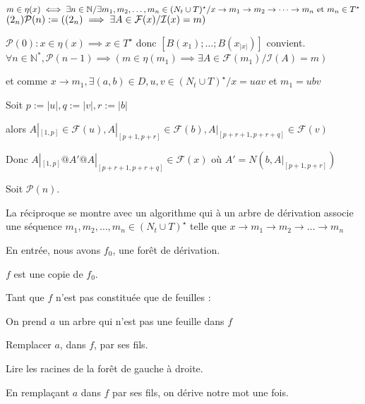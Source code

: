\documentclass[a4paper,12pt]{article}
\newcommand{\norm}[1]{\lvert #1 \rvert}
\newlength{\mydepth}
\newlength{\myheight}
\newenvironment{answer}
{\par\begin{lrbox}{\mybox}\quad\begin{minipage}{\linewidth}\color{black}\setlength{\parskip}{10pt plus 1pt minus 1pt}\vspace*{-.7\baselineskip}}
{\end{minipage}\end{lrbox}
\settodepth{\mydepth}{\usebox{\mybox}}
\settoheight{\myheight}{\usebox{\mybox}}
\addtolength{\myheight}{\mydepth}
\noindent\makebox[0pt]{
  \color{gray}\hspace{-0pt}\rule[-\mydepth]{1pt}{\myheight}}
  \usebox{\mybox}
  }
\begin{document}
\begin{answer} 
$
m \in \eta(x)\\
\iff \exists n \in \mathbb{N} / \exists m_1,m_2,\dots,m_n \in (N_t \cup T)^\star / x \rightarrow m_1 \rightarrow m_2 \rightarrow \dots \rightarrow m_n\text{ et }m_n \in T^\star$    $ (2_n)\\
\mathcal{P}(n) := ((2_n) \implies \exists A \in \mathcal{F}(x) / \mathcal{I}(x) = m)$\\
\begin{answer} 
$\mathcal{P}(0) : x \in \eta(x) \implies x \in T^\star$ donc $[B (x_1);\dots;B (x_{\norm{x}})]$ convient.\\
$\forall n \in \mathbb{N}^*,\mathcal{P}(n-1) \implies (m \in \eta(m_1) \implies \exists A \in \mathcal{F}(m_1)/ \mathcal{I}(A) = m)$

 et comme $x\rightarrow m_1,\exists (a,b) \in D, u,v\in (N_t\cup T)^\star /x = uav$ et $m_1 = ubv$

 Soit $p := \norm{u}, q := \norm{v}, r := \norm{b}$
 
 alors $A|_{[1,p]} \in \mathcal{F}(u), A|_{[p+1,p+r]} \in \mathcal{F}(b), A|_{[p+r+1,p+r+q]} \in \mathcal{F}(v)$

 Donc $A|_{[1,p]}@A'@A|_{[p+r+1,p+r+q]}\in \mathcal{F}(x)$ où $A' = N (b,A|_{[p+1,p+r]})$

 Soit $\mathcal{P}(n)$.
\end{answer}
\end{answer}
La réciproque se montre avec un algorithme qui à un arbre de dérivation associe une séquence $m_1,m_2,\dots,m_n \in (N_t \cup T)^\star$ telle que $x \rightarrow m_1 \rightarrow m_2 \rightarrow \dots \rightarrow m_n$

En entrée, nous avons $f_0$, une forêt de dérivation.
\begin{answer} 
$f$ est une copie de $f_0$. 

Tant que $f$ n'est pas constituée que de feuilles :

\begin{answer} 
    On prend $a$ un arbre qui n'est pas une feuille dans $f$

    Remplacer $a$, dans $f$, par ses fils.

    Lire les racines de la forêt de gauche à droite.
\end{answer}
\end{answer}
En remplaçant $a$ dans $f$ par ses fils, on dérive notre mot une fois.\\\\
\end{document}
